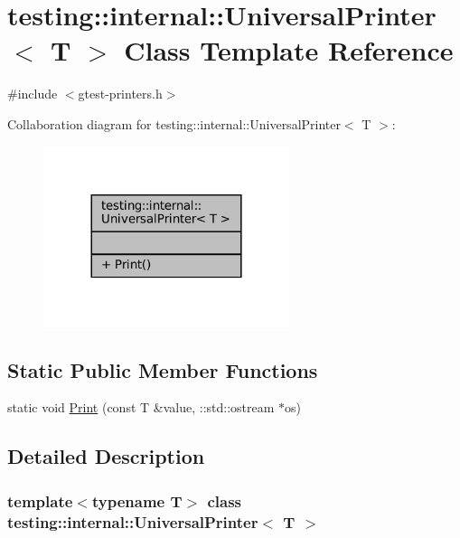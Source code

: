 \hypertarget{classtesting_1_1internal_1_1UniversalPrinter}{}\section{testing\+:\+:internal\+:\+:Universal\+Printer$<$ T $>$ Class Template Reference}
\label{classtesting_1_1internal_1_1UniversalPrinter}


{\ttfamily \#include $<$gtest-\/printers.\+h$>$}



Collaboration diagram for testing\+:\+:internal\+:\+:Universal\+Printer$<$ T $>$\+:
\nopagebreak
\begin{figure}[H]
\begin{center}
\leavevmode
\includegraphics[width=204pt]{classtesting_1_1internal_1_1UniversalPrinter__coll__graph}
\end{center}
\end{figure}
\subsection*{Static Public Member Functions}
\begin{DoxyCompactItemize}
\item 
static void \hyperlink{classtesting_1_1internal_1_1UniversalPrinter_aecec021e1abbaa260b701e24e3fe33eb}{Print} (const T \&value, \+::std\+::ostream $\ast$os)
\end{DoxyCompactItemize}


\subsection{Detailed Description}
\subsubsection*{template$<$typename T$>$\newline
class testing\+::internal\+::\+Universal\+Printer$<$ T $>$}



